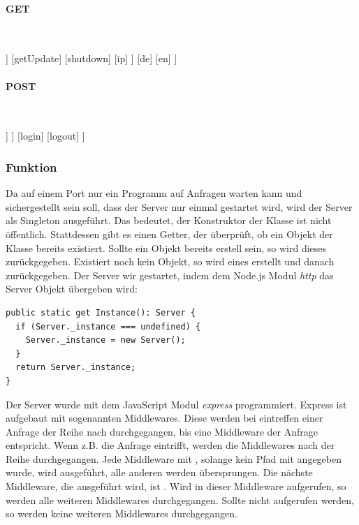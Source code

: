 \paragraph*{GET}\mbox{}\\
\begin{forest}
	[\textit{root}
		[api
			[version]
			[callMeMaybe
				[?q{=}times]
				[?q{=}status]
				[?q{=}info]
				[?q{=}positions]
				[?q{=}errors\_warnings]			
			]
			[getUpdate]
			[shutdown]
			[ip]		
		]
		[de]
		[en]
	]
\end{forest}

\paragraph*{POST}\mbox{}\\
\begin{forest}
	[\textit{root}
		[api
			[putMeHere
				[?q{=}times]
				[?q{=}changeState]			
			]	
		]
		[login]
		[logout]	
	]
\end{forest}


\subsubsection{Funktion}
\label{sec:ums-server-funktion}
Da auf einem Port nur ein Programm auf Anfragen warten kann und sichergestellt sein soll, dass der Server nur einmal gestartet wird, wird der Server als Singleton ausgeführt. Das bedeutet, der Konstruktor der Klasse ist nicht öffentlich. Stattdessen gibt es einen Getter, der überprüft, ob ein Objekt der Klasse bereits existiert. Sollte ein Objekt bereits erstell sein, so wird dieses zurückgegeben. Existiert noch kein Objekt, so wird eines erstellt und danach zurückgegeben. Der Server wir gestartet, indem dem Node.js Modul \textit{http} das Server Objekt übergeben wird: 

\begin{lstlisting}[caption=Server Singleton,label=server_singleton,style=TS]
public static get Instance(): Server {
  if (Server._instance === undefined) {
    Server._instance = new Server();
  }
  return Server._instance;
}
\end{lstlisting}

Der Server wurde mit dem JavaScript Modul \textit{express} programmiert. Express ist aufgebaut mit sogenannten Middlewares. Diese werden bei eintreffen einer Anfrage der Reihe nach durchgegangen, bis eine Middleware der Anfrage entspricht. Wenn z.B. die Anfrage  eintrifft, werden die Middlewares nach der Reihe durchgegangen. Jede Middleware mit , solange kein Pfad mit angegeben wurde, wird ausgeführt, alle anderen werden übersprungen. Die nächste Middleware, die ausgeführt wird, ist . Wird in dieser Middleware  aufgerufen, so werden alle weiteren Middlewares durchgegangen. Sollte  nicht aufgerufen werden, so werden keine weiteren Middlewares durchgegangen.

